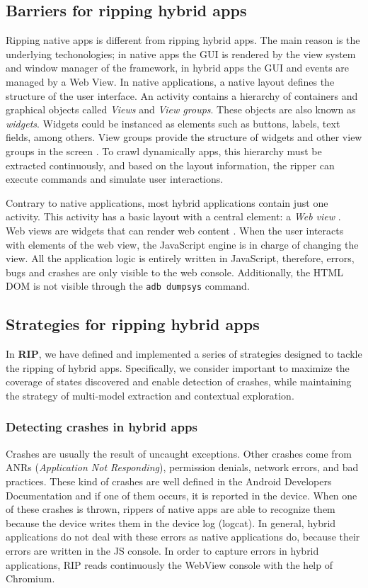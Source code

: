 \subsection{Barriers for ripping hybrid apps }
Ripping native apps is different from ripping hybrid apps. The main reason is the underlying techonologies; in native apps the GUI is rendered by the view system and window manager of the  framework, in hybrid apps the GUI and events are managed by a Web View. In native applications, a native layout defines the structure of the user interface. An activity contains a hierarchy of containers and graphical objects called \textit{Views} and \textit{View groups}. These objects are also known as \textit{widgets}. Widgets could be instanced as elements such as buttons, labels, text fields, among others. View groups provide the structure of widgets and other view groups in the screen \cite{layouts}. To crawl dynamically apps, this hierarchy must be extracted continuously, and based on the layout information, the ripper can execute commands and simulate user interactions.

Contrary to native applications, most hybrid applications contain just one activity. This activity has a basic layout with a central element: a \textit{Web view} \cite{webView}. Web views are widgets that can render web content . When the user interacts with elements of the web view, the JavaScript engine is in charge of changing the view. All the application logic is entirely written in JavaScript, therefore, errors, bugs and crashes are only visible to the web console. Additionally, the HTML DOM is not visible through the \verb|adb dumpsys| command.

\subsection{Strategies for ripping hybrid apps }
In \textbf{RIP}, we have defined and implemented a series of strategies designed to tackle the ripping of hybrid apps. Specifically, we consider important to maximize the coverage of states discovered and enable detection of crashes, while maintaining the  strategy of multi-model extraction and contextual exploration. 

\subsubsection{Detecting crashes in hybrid apps}
Crashes are usually the result of uncaught exceptions. Other crashes come from ANRs (\textit{Application Not Responding}), permission denials, network errors, and bad practices. These kind of crashes are well defined in the Android Developers Documentation and if one of them occurs, it is reported in the device. When one of these crashes is thrown, rippers of native apps are able to recognize them because the device writes them in the device log (logcat). In general, hybrid applications do not deal with these errors as native applications do, because their errors  are written in the JS console. In order to capture errors in hybrid applications, RIP reads continuously the WebView console with the help of Chromium.


